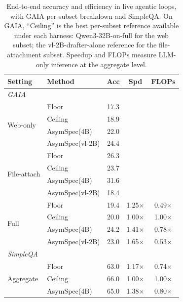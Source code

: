 \documentclass[11pt]{article}
\theoremstyle{plain}
\theoremstyle{definition}
\begin{document}
\begin{table}[h!]
\centering
\footnotesize
\setlength{\tabcolsep}{5pt}
\begin{tabular}{l l ccc}
\toprule
Setting & Method & Acc & Spd & FLOPs \\
\midrule
\multicolumn{5}{l}{\textit{GAIA}} \\
\midrule
\multirow{4}{*}{Web-only}
  & Floor            & 17.3 &  &  \\
  & Ceiling          & 18.9 &  &  \\
  & AsymSpec(4B)     & 22.0 &  &  \\
  & AsymSpec(vl-2B)  & 24.4 &  &  \\
\midrule
\multirow{4}{*}{File-attach}
  & Floor            & 26.3 &  &  \\
  & Ceiling          & 23.7 &  &  \\
  & AsymSpec(4B)     & 31.6 &  &  \\
  & AsymSpec(vl-2B)  & 18.4 &  &  \\
\midrule
\multirow{4}{*}{Full}
  & Floor            & 19.4 & 1.25$\times$ & 0.49$\times$ \\
  & Ceiling          & 20.0 & 1.00$\times$ & 1.00$\times$ \\
  & AsymSpec(4B)     & 24.2 & 1.41$\times$ & 0.78$\times$ \\
  & AsymSpec(vl-2B)  & 23.0 & 1.65$\times$ & 0.53$\times$ \\
\midrule
\multicolumn{5}{l}{\textit{SimpleQA}} \\
\midrule
\multirow{3}{*}{Aggregate}
  & Floor            & 63.0 & 1.17$\times$ & 0.74$\times$ \\
  & Ceiling          & 66.0 & 1.00$\times$ & 1.00$\times$ \\
  & AsymSpec(4B)     & 65.0 & 1.38$\times$ & 0.80$\times$ \\
\bottomrule
\end{tabular}
\caption{End-to-end accuracy and efficiency in live agentic loops, with GAIA per-subset breakdown and SimpleQA. On GAIA, ``Ceiling'' is the best per-subset reference available under each harness: Qwen3-32B-on-full for the web subset; the vl-2B-drafter-alone reference for the file-attachment subset. Speedup and FLOPs measure LLM-only inference at the aggregate level.}
\label{tab:agent-e2e}
\end{table}
\end{document}
